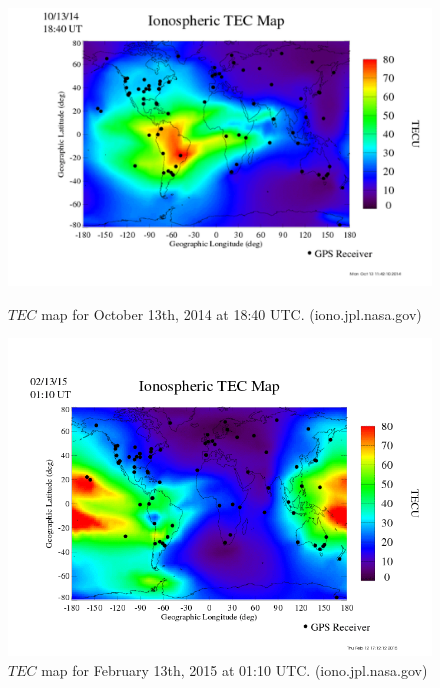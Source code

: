 \begin{figure}[htb]
\centering
\begin{minipage}[b]{0.48\textwidth}
\centering
\includegraphics[width=0.95\linewidth]{Ionosphere/figures/TEC_map_20141013_18-40UT.png}
\caption{$TEC$ map for October 13th, 2014 at 18:40 UTC. (iono.jpl.nasa.gov)  }
\label{Fig:fall_tec_global}
\end{minipage}%
\begin{minipage}[b]{0.02\textwidth}
\hspace{1cm}
\end{minipage}%
\begin{minipage}[b]{0.48\textwidth}
\centering
\includegraphics[width=0.95\linewidth]{Ionosphere/figures/TEC_map_20150213_01-10UT.png}
\caption{$TEC$ map for February 13th, 2015 at 01:10 UTC. (iono.jpl.nasa.gov)  }
\label{Fig:winter_tec_global}
\end{minipage}
\end{figure}

